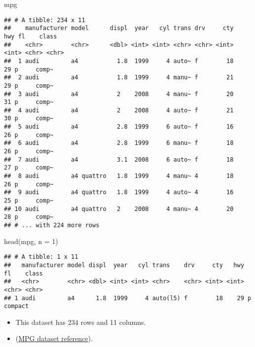 \documentclass[
]{article}
\newenvironment{Shaded}{\begin{snugshade}}{\end{snugshade}}
\newcommand{\AttributeTok}[1]{\textcolor[rgb]{0.77,0.63,0.00}{#1}}
\newcommand{\DecValTok}[1]{\textcolor[rgb]{0.00,0.00,0.81}{#1}}
\newcommand{\FunctionTok}[1]{\textcolor[rgb]{0.00,0.00,0.00}{#1}}
\newcommand{\NormalTok}[1]{#1}
\providecommand{\tightlist}{%
  \setlength{\itemsep}{0pt}\setlength{\parskip}{0pt}}
\begin{document}
\begin{Shaded}
\begin{Highlighting}[]
\NormalTok{mpg}
\end{Highlighting}
\end{Shaded}

\begin{verbatim}
## # A tibble: 234 x 11
##    manufacturer model      displ  year   cyl trans drv     cty   hwy fl    class
##    <chr>        <chr>      <dbl> <int> <int> <chr> <chr> <int> <int> <chr> <chr>
##  1 audi         a4           1.8  1999     4 auto~ f        18    29 p     comp~
##  2 audi         a4           1.8  1999     4 manu~ f        21    29 p     comp~
##  3 audi         a4           2    2008     4 manu~ f        20    31 p     comp~
##  4 audi         a4           2    2008     4 auto~ f        21    30 p     comp~
##  5 audi         a4           2.8  1999     6 auto~ f        16    26 p     comp~
##  6 audi         a4           2.8  1999     6 manu~ f        18    26 p     comp~
##  7 audi         a4           3.1  2008     6 auto~ f        18    27 p     comp~
##  8 audi         a4 quattro   1.8  1999     4 manu~ 4        18    26 p     comp~
##  9 audi         a4 quattro   1.8  1999     4 auto~ 4        16    25 p     comp~
## 10 audi         a4 quattro   2    2008     4 manu~ 4        20    28 p     comp~
## # ... with 224 more rows
\end{verbatim}

\begin{Shaded}
\begin{Highlighting}[]
\FunctionTok{head}\NormalTok{(mpg, }\AttributeTok{n =} \DecValTok{1}\NormalTok{)}
\end{Highlighting}
\end{Shaded}

\begin{verbatim}
## # A tibble: 1 x 11
##   manufacturer model displ  year   cyl trans    drv     cty   hwy fl    class  
##   <chr>        <chr> <dbl> <int> <int> <chr>    <chr> <int> <int> <chr> <chr>  
## 1 audi         a4      1.8  1999     4 auto(l5) f        18    29 p     compact
\end{verbatim}

\begin{itemize}
\tightlist
\item
  This dataset has 234 rows and 11 columns.
\item
  (\href{https://ggplot2.tidyverse.org/reference/mpg.html}{MPG dataset
  reference}).
\end{itemize}
\end{document}
